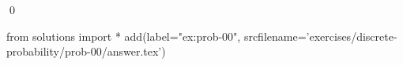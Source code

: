 
\begin{ex} 
  \label{ex:prob-00}
  
  \qed
\end{ex} 
\begin{python0}
from solutions import *
add(label="ex:prob-00",
    srcfilename='exercises/discrete-probability/prob-00/answer.tex') 
\end{python0}

